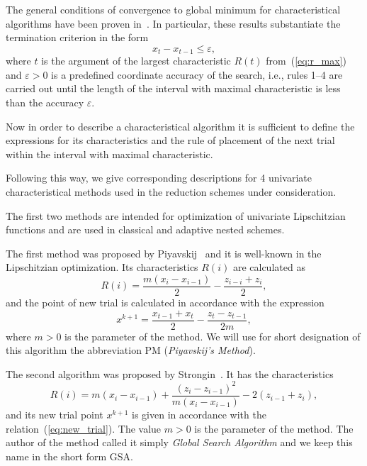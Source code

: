 \documentclass[preprint]{elsarticle}
\begin{document}
The general conditions of convergence to global minimum for characteristical algorithms have been proven in~\cite{bib49}. In particular, these results substantiate the termination criterion in the form
\begin{equation}
  \label{eq:stop_criterion}
  x_t - x_{t - 1} \leq \varepsilon,
\end{equation}
%
where $t$ is the argument of the largest characteristic $R(t)$ from~(\ref{eq:r_max}) and $\varepsilon > 0$ is a predefined coordinate accuracy of the search, i.e., rules 1--4 are carried out until the length of the interval with maximal characteristic is
less than the accuracy $\varepsilon$.

Now in order to describe a characteristical algorithm it is sufficient to define the expressions for its characteristics and the rule of placement of the next trial within the interval with maximal characteristic.

Following this way, we give corresponding descriptions for 4 univariate characteristical methods used in the reduction schemes under consideration.

The first two methods are intended for optimization of univariate Lipschitzian functions and are used in classical and adaptive nested schemes.

The first method was proposed by Piyavskij~\cite{bib26} and it is well-known in the Lipschitzian optimization. Its characteristics $R(i)$ are calculated as
\begin{equation}
  R(i) = \frac{m (x_i - x_{i - 1})}{2} - \frac{z_{i - i} + z_i}{2},
\end{equation}
%
and the point of new trial is calculated in accordance with the expression
\begin{equation}
  \label{eq:new_trial}
  x^{k + 1} = \frac{x_{t - 1} + x_t}{2} - \frac{z_t - z_{t - 1}}{2m},
\end{equation}
%
where $m > 0$ is the parameter of the method. We will use for short designation of this algorithm the abbreviation
PM (\emph{Piyavskij's Method}).

The second algorithm was proposed by Strongin~\cite{bib5,bib15,bib51}. It has the characteristics
\begin{equation}
  R(i) = m (x_i - x_{i - 1}) + \frac{(z_i - z_{i - 1})^2}{m (x_i - x_{i - 1})} - 2 (z_{i - 1} + z_i),
\end{equation}
%
and its new trial point $x^{k + 1}$ is given in accordance with the relation~(\ref{eq:new_trial}). The value $m > 0$ is the parameter of the method. The author of the method called it simply \emph{Global Search Algorithm} and we keep this name in the short form GSA.
\end{document}
